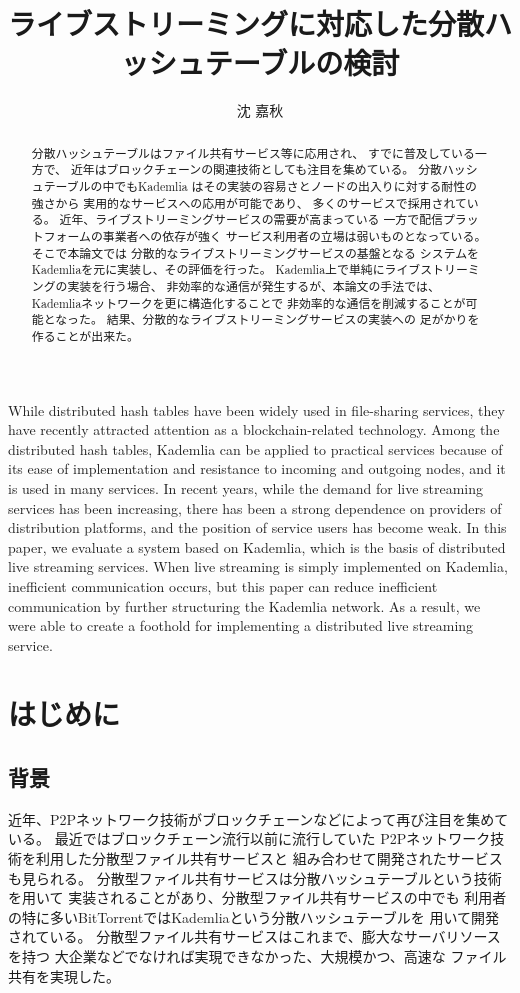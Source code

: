 \documentclass[sotsuron]{jcsie}
\title{ライブストリーミングに対応した分散ハッシュテーブルの検討}
\author{沈 嘉秋}
\begin{document}
\maketitle
\emaketitle
{}
\begin{abstract}    
	分散ハッシュテーブルはファイル共有サービス等に応用され、
	すでに普及している一方で、
	近年はブロックチェーンの関連技術としても注目を集めている。
	分散ハッシュテーブルの中でもKademlia\cite{maymounkov2002kademlia}
	はその実装の容易さとノードの出入りに対する耐性の強さから
	実用的なサービスへの応用が可能であり、
	多くのサービスで採用されている。
	近年、ライブストリーミングサービスの需要が高まっている
	一方で配信プラットフォームの事業者への依存が強く
	サービス利用者の立場は弱いものとなっている。
	そこで本論文では
	分散的なライブストリーミングサービスの基盤となる
	システムをKademliaを元に実装し、その評価を行った。
	Kademlia上で単純にライブストリーミングの実装を行う場合、
	非効率的な通信が発生するが、本論文の手法では、
	Kademliaネットワークを更に構造化することで
	非効率的な通信を削減することが可能となった。
	結果、分散的なライブストリーミングサービスの実装への
	足がかりを作ることが出来た。
\end{abstract}
\begin{eabstract}
	While distributed hash tables have been widely used in file-sharing services,
	they have recently attracted attention as a blockchain-related technology. 
	Among the distributed hash tables, 
	Kademlia can be applied to practical services because of 
	its ease of implementation and resistance to incoming and outgoing nodes, 
	and it is used in many services. 
	In recent years, while the demand for live streaming services has been 
	increasing, there has been a strong dependence on providers of distribution 
	platforms, and the position of service users has become weak. 
	In this paper, we evaluate a system based on Kademlia, 
	which is the basis of distributed live streaming services. 
	When live streaming is simply implemented on Kademlia, 
	inefficient communication occurs, but this paper can reduce inefficient 
	communication by further structuring the Kademlia network. 
	As a result, we were able to create a foothold for implementing a 
	distributed live streaming service.
\end{eabstract}
\tableofcontents
{}
\chapter{はじめに}
\section{背景}
近年、P2Pネットワーク技術がブロックチェーンなどによって再び注目を集めている。
最近ではブロックチェーン流行以前に流行していた
P2Pネットワーク技術を利用した分散型ファイル共有サービスと
組み合わせて開発されたサービスも見られる。
\cite{BitTorre1:online}
分散型ファイル共有サービスは分散ハッシュテーブルという技術を用いて
実装されることがあり、分散型ファイル共有サービスの中でも
利用者の特に多いBitTorrentではKademliaという分散ハッシュテーブルを
用いて開発されている。
分散型ファイル共有サービスはこれまで、膨大なサーバリソースを持つ
大企業などでなければ実現できなかった、大規模かつ、高速な
ファイル共有を実現した。
\end{document}
